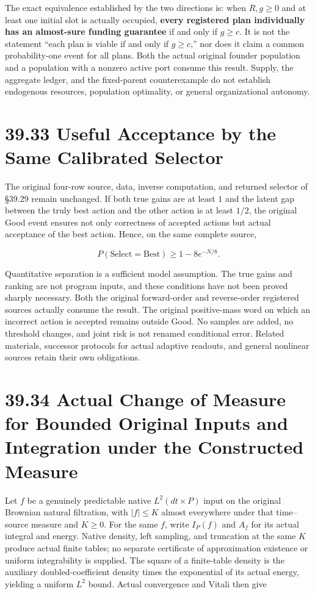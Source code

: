\documentclass[
  english,
  11pt,
  oneside]{book}
\begin{document}
The exact equivalence established by the two directions is: when \(R,g\ge0\) and at least one initial slot is actually occupied, \textbf{every registered plan individually has an almost-sure funding guarantee} if and only if \(g\ge c\). It is not the statement ``each plan is viable if and only if \(g\ge c\),'' nor does it claim a common probability-one event for all plans. Both the actual original founder population and a population with a nonzero active port consume this result. Supply, the aggregate ledger, and the fixed-parent counterexample do not establish endogenous resources, population optimality, or general organizational autonomy.

\section{39.33 Useful Acceptance by the Same Calibrated Selector}\label{useful-acceptance-by-the-same-calibrated-selector}

The original four-row source, data, inverse computation, and returned selector of §39.29 remain unchanged. If both true gains are at least \(1\) and the latent gap between the truly best action and the other action is at least \(1/2\), the original Good event ensures not only correctness of accepted actions but actual acceptance of the best action. Hence, on the same complete source,

\[P(\mathrm{Select}=\mathrm{Best})\ge1-8e^{-N/8}.\]

Quantitative separation is a sufficient model assumption. The true gains and ranking are not program inputs, and these conditions have not been proved sharply necessary. Both the original forward-order and reverse-order registered sources actually consume the result. The original positive-mass word on which an incorrect action is accepted remains outside Good. No samples are added, no threshold changes, and joint risk is not renamed conditional error. Related materials, successor protocols for actual adaptive readouts, and general nonlinear sources retain their own obligations.

\section{39.34 Actual Change of Measure for Bounded Original Inputs and Integration under the Constructed Measure}\label{actual-change-of-measure-for-bounded-original-inputs-and-integration-under-the-constructed-measure}

Let \(f\) be a genuinely predictable native \(L^2(dt\times P)\) input on the original Brownian natural filtration, with \(|f|\le K\) almost everywhere under that time--source measure and \(K\ge0\). For the same \(f\), write \(I_P(f)\) and \(A_f\) for its actual integral and energy. Native density, left sampling, and truncation at the same \(K\) produce actual finite tables; no separate certificate of approximation existence or uniform integrability is supplied. The square of a finite-table density is the auxiliary doubled-coefficient density times the exponential of its actual energy, yielding a uniform \(L^2\) bound. Actual convergence and Vitali then give
\end{document}
